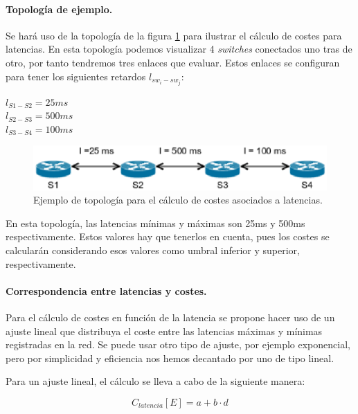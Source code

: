 \documentclass[a4paper,11pt]{book}
\begin{document}
\paragraph{Topología de ejemplo.}

Se hará uso de la topología de la figura \ref{topo1} para ilustrar el cálculo de costes para latencias. En esta topología podemos visualizar 4 \emph{switches} conectados uno tras de otro, por tanto tendremos tres enlaces que evaluar. Estos enlaces se configuran para tener los siguientes retardos $l_{sw_i-sw_j}$:

\begin{center}
$l_{S1-S2} = 25 ms$ \\ $l_{S2-S3} = 500 ms$ \\ $l_{S3-S4} = 100 ms $
\end{center}

\begin{figure}[tb]
\centering
\includegraphics[scale=0.8]{./figuras/topo1}
\caption{Ejemplo de topología para el cálculo de costes asociados a latencias.}\label{topo1}
\end{figure}

En esta topología, las latencias mínimas y máximas son 25ms y 500ms respectivamente. Estos valores hay que tenerlos en cuenta, pues los costes se calcularán considerando esos valores como umbral inferior y superior, respectivamente.

\paragraph{Correspondencia entre latencias y costes.}

Para el cálculo de costes en función de la latencia se propone hacer uso de un ajuste lineal que distribuya el coste entre las latencias máximas y mínimas registradas en la red. Se puede usar otro tipo de ajuste, por ejemplo exponencial, pero por simplicidad y eficiencia nos hemos decantado por uno de tipo lineal.
 
  Para un ajuste lineal, el cálculo se lleva a cabo de la siguiente manera:
 
\begin{equation}
 C_{latencia}[E]=a + b \cdot d
 \label{ec:clatencia-lin}
\end{equation} 
\end{document}
